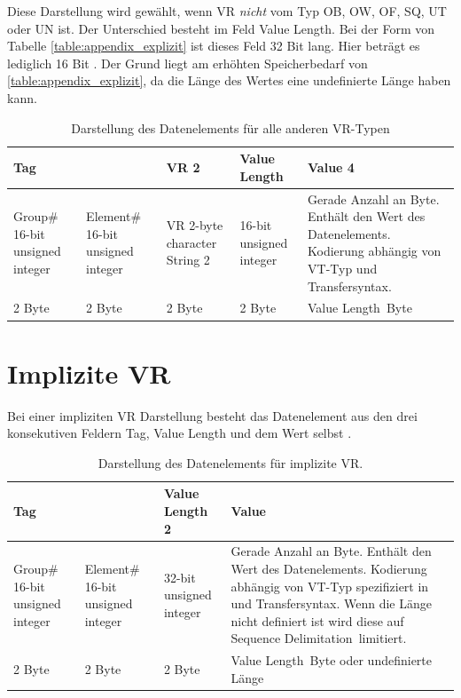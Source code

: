 Diese Darstellung wird gewählt, wenn VR \textit{nicht} vom Typ OB, OW, OF, SQ, UT oder UN ist. Der Unterschied besteht im Feld \glqq Value Length\grqq. Bei der Form von Tabelle \ref{table:appendix_explizit} ist dieses Feld 32 Bit lang. Hier beträgt es lediglich 16 Bit \cite[7.1.2]{dicom:structure}. Der Grund liegt am erhöhten Speicherbedarf von \ref{table:appendix_explizit}, da die Länge des Wertes eine undefinierte Länge haben kann.

\begin{table}
	\begin{tabularx}{\textwidth}{|X|X|X|X|p{12cm}|}
	\toprule \hline
	\multicolumn{2}{|l|}{\textbf{Tag}} & \textbf{VR} 2 & \textbf{Value Length} & \textbf{Value} 4 \\ \hline
	Group\# 16-bit unsigned integer & Element\# 16-bit unsigned integer & VR 2-byte character String 2 & 16-bit unsigned integer & Gerade Anzahl an Byte. Enthält den Wert des Datenelements. Kodierung abhängig von VT-Typ und Transfersyntax. \\ \hline
	2 Byte & 2 Byte & 2 Byte & 2 Byte & \glqq Value Length\grqq\ Byte \\ \hline
	\bottomrule
	\end{tabularx}
    \caption {Darstellung des Datenelements für alle anderen VR-Typen}
    \label{table:appendix_explizit_else}
\end{table}

\section{Implizite VR}

Bei einer impliziten VR Darstellung besteht das Datenelement aus den drei konsekutiven Feldern Tag, Value Length und dem Wert selbst \cite[7.1.3]{dicom:structure}.

\begin{table}
	\begin{tabularx}{\textwidth}{|X|X|X|p{12cm}|}
	\toprule \hline
	\multicolumn{2}{|l|}{\textbf{Tag}} & \textbf{Value Length} 2 & \textbf{Value} \\ \hline
	Group\# 16-bit unsigned integer & Element\# 16-bit unsigned integer & 32-bit unsigned integer & Gerade Anzahl an Byte. Enthält den Wert des Datenelements. Kodierung abhängig von VT-Typ spezifiziert in \cite{dicom:dd} und Transfersyntax. Wenn die Länge nicht definiert ist wird diese auf \glqq Sequence Delimitation\grqq\ limitiert. \\ \hline
	2 Byte & 2 Byte & 2 Byte & \glqq Value Length\grqq\ Byte oder undefinierte Länge \\ \hline
	
	\bottomrule
	
	\end{tabularx}
    \caption {Darstellung des Datenelements für implizite VR.}
    \label{table:appendix_implizit}
\end{table}


